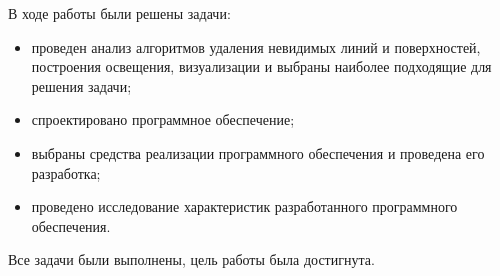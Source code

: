 
В ходе работы были решены задачи:
\begin{itemize}
	\item проведен анализ алгоритмов  удаления невидимых линий и поверхностей, построения освещения, визуализации и выбраны наиболее подходящие для решения задачи;
	\item спроектировано программное обеспечение;
	\item выбраны средства реализации программного обеспечения и проведена его разработка;
	\item проведено исследование характеристик разработанного программного обеспечения.
\end{itemize}
Все задачи были выполнены, цель работы была достигнута.